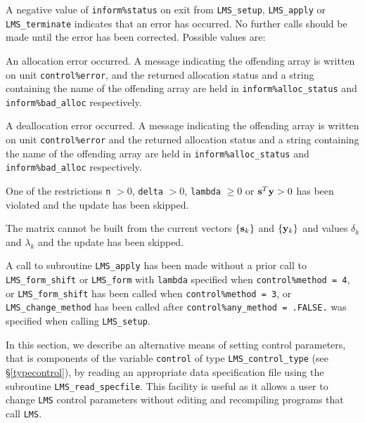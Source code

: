 \documentclass{galahad}
\newcommand{\packagename}{LMS}
\begin{document}

\galerrors
A negative value of {\tt inform\%status} on exit from
{\tt \packagename\_setup},
{\tt \packagename\_apply}
or
{\tt \packagename\_terminate}
indicates that an error has occurred. No further calls should be made
until the error has been corrected. Possible values are:

\begin{description}

 An allocation error occurred.
A message indicating the offending
array is written on unit {\tt control\%error}, and the returned allocation
status and a string containing the name of the offending array
are held in {\tt inform\%alloc\_\-status}
and {\tt inform\%bad\_alloc} respectively.

 A deallocation error occurred.
A message indicating the offending
array is written on unit {\tt control\%error} and the returned allocation
status and a string containing the name of the offending array
are held in {\tt inform\%alloc\_\-status}
and {\tt inform\%bad\_alloc} respectively.

 One of the restrictions
  {\tt n} $> 0$,  {\tt delta} $> 0$, {\tt lambda} $\geq 0$ or
  ${\mathbf{s}}^T {\mathbf{y}} > 0$ has been violated and the update has
  been skipped.

 The matrix cannot be built
 from the current vectors $\{{\mathbf{s}}_k\}$ and $\{{\mathbf{y}}_k\}$ and values
 $\delta_k$ and $\lambda_k$ and the update has been skipped.

 A call to subroutine
{\tt \packagename\_apply} has been made without a prior call to
{\tt \packagename\_form\_shift} or
{\tt \packagename\_form} with {\tt lambda} specified
 when {\tt control\%method = 4},
 or {\tt \packagename\_form\_shift} has been called when
{\tt control\%method = 3}, or
{\tt \packagename\_change\_method} has been called after
{\tt control\%any\_method = .FALSE.} was specified when
calling {\tt \packagename\_setup}.

\vspace*{1mm}


\end{description}


\galfeatures
\noindent In this section, we describe an alternative means of setting
control parameters, that is components of the variable {\tt control} of type
{\tt \packagename\_control\_type}
(see \S\ref{typecontrol}),
by reading an appropriate data specification file using the
subroutine {\tt \packagename\_read\_specfile}. This facility
is useful as it allows a user to change  {\tt \packagename} control parameters
without editing and recompiling programs that call {\tt \packagename}.
\end{document}
